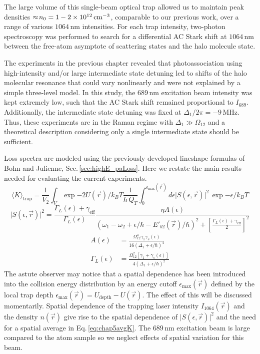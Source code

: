 The large volume of this single-beam optical trap allowed us to maintain peak densities $\approx\!n_0 = 1-2 \times 10^{12} \, \text{cm}^{-3}$, comparable to our previous work, over a range of various $1064$\,nm intensities.
For each trap intensity, two-photon spectroscopy was performed to search for a differential AC Stark shift at $1064\,\text{nm}$ between the free-atom asymptote of scattering states and the halo molecule state.

The experiments in the previous chapter revealed that photoassociation using high-intensity and/or large intermediate state detuning led to shifts of the halo molecular resonance that could vary nonlinearly and were not explained by a simple three-level model.
In this study, the $689$\,nm excitation beam intensity was kept extremely low, such that the AC Stark shift remained proportional to $I_{689}$.
Additionally, the intermediate state detuning was fixed at $\Delta_1/2 \pi = -9$\,MHz.
Thus, these experiments are in the Raman regime with $\Delta_1 \gg \Omega_{12}$ and a theoretical description considering only a single intermediate state should be sufficient.


Loss spectra are modeled using the previously developed lineshape formulas of Bohn and Julienne, Sec.\,\ref{sec:highE_paLoss}.
Here we restate the main results needed for evaluating the current experiments.
\begingroup
\addtolength{\jot}{1em}
\begin{equation} \label{eq:chap5avgK}
	\langle K \rangle_\text{trap} = \frac{1}{V_2} \int_V \exp{-2 U(\vec{r})/k_{B}T} \frac{1}{h\,Q_{T}} \int_{0}^{\epsilon_{\text{max}}(\vec{r})} d\epsilon \vert S(\epsilon, \vec{r}) \vert^2 \,\exp{-\epsilon/k_{B}T}
\end{equation}
\begin{equation}\label{5equationApproxLorentzian}
  \vert S(\epsilon, \vec{r}) \vert^2 = \frac{\Gamma_L(\epsilon)+\gamma_{\text{eff}}}{\Gamma_L(\epsilon)} \frac{\eta  A(\epsilon)} {\left(\omega_1-\omega_2+\epsilon/\hbar-E'_{b2}(\vec{r})/\hbar\right)^2+\left[
  	\frac{\Gamma_L(\epsilon)+\gamma_{\text{eff}}}{2}\right]^2}
\end{equation}
\begin{align}
  A(\epsilon) &= \frac{\Omega_{12}^{4}\gamma_1 \gamma_s(\epsilon)}{16(\Delta_1+\epsilon/\hbar)^4} \\
  \Gamma_L(\epsilon) &= \frac{\Omega_{12}^{2}[\gamma_1 +\gamma_s(\epsilon)]}{4(\Delta_1+\epsilon/\hbar)^2}
\end{align}
\endgroup
The astute observer may notice that a spatial dependence has been introduced into the collision energy distribution by an energy cutoff $\epsilon_{\text{max}}(\vec{r})$ defined by the local trap depth $\epsilon_{\text{max}}(\vec{r}) = U_{\text{depth}} - U(\vec{r})$.
The effect of this will be discussed momentarily.
Spatial dependence of the trapping laser intensity $I_{1064}(\vec{r})$ and the density $n(\vec{r})$ give rise to the spatial dependence of $\vert S(\epsilon, \vec{r}) \vert^2$ and the need for a spatial average in Eq.\,\ref{eq:chap5avgK}.
The $689$\,nm excitation beam is large compared to the atom sample so we neglect effects of spatial variation for this beam.

